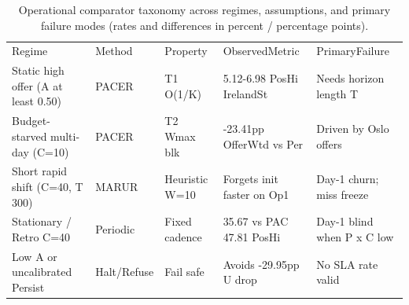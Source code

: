 \begin{table}[!ht]
\centering\footnotesize\setlength{\tabcolsep}{3.5pt}
\caption{Operational comparator taxonomy across regimes, assumptions, and primary failure modes (rates and differences in percent / percentage points).}
\begin{tabular}{lllll}
\hline
Regime & Method & Property & ObservedMetric & PrimaryFailure \\
Static high offer (A at least 0.50) & PACER & T1 O(1/K) & 5.12-6.98 PosHi IrelandSt & Needs horizon length T \\
Budget-starved multi-day (C=10) & PACER & T2 Wmax blk & -23.41pp OfferWtd vs Per & Driven by Oslo offers \\
Short rapid shift (C=40, T 300) & MARUR & Heuristic W=10 & Forgets init faster on Op1 & Day-1 churn; miss freeze \\
Stationary / Retro C=40 & Periodic & Fixed cadence & 35.67 vs PAC 47.81 PosHi & Day-1 blind when P x C low \\
Low A or uncalibrated Persist & Halt/Refuse & Fail safe & Avoids -29.95pp U drop & No SLA rate valid \\
\hline
\end{tabular}
\end{table}
